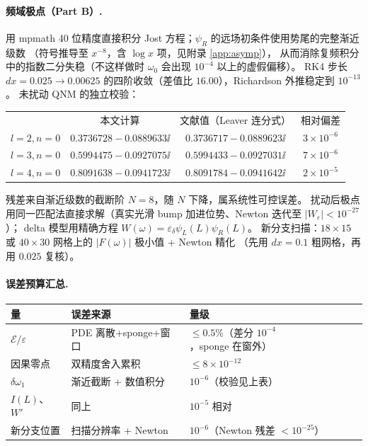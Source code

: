 \paragraph{频域极点（Part B）.}
用 mpmath 40 位精度直接积分 Jost 方程；$\psi_R$ 的远场初条件使用势尾的完整渐近级数
（符号推导至 $x^{-8}$，含 $\log x$ 项，见附录 \ref{app:asymp}），
从而消除复频积分中的指数二分失稳（不这样做时 $\omega_0$ 会出现 $10^{-4}$ 以上的虚假偏移）。
RK4 步长 $dx=0.025\to0.00625$ 的四阶收敛（差值比 $16.00$），Richardson 外推稳定到 $10^{-13}$。
未扰动 QNM 的独立校验：
\begin{center}\small
\begin{tabular}{lccc}
\toprule
 & {本文计算}& {文献值（Leaver 连分式）\cite{Leaver1985,Berti2009}}& {相对偏差}\\
$l=2,n=0$ & $0.3736728-0.0889633\ii$ & $0.3736717-0.0889623\ii$ & $3\times10^{-6}$\\
$l=3,n=0$ & $0.5994475-0.0927075\ii$ & $0.5994433-0.0927031\ii$ & $7\times10^{-6}$\\
$l=4,n=0$ & $0.8091638-0.0941723\ii$ & $0.8091784-0.0941642\ii$ & $2\times10^{-5}$\\
\bottomrule
\end{tabular}
\end{center}
残差来自渐近级数的截断阶 $N=8$，随 $N$ 下降，属系统性可控误差。
扰动后极点用同一匹配法直接求解（真实光滑 bump 加进位势、Newton 迭代至 $|W_\varepsilon|<10^{-27}$）；
delta 模型用精确方程 $W(\omega)=\varepsilon_\delta\psi_L(L)\psi_R(L)$。
新分支扫描：$18\times15$ 或 $40\times30$ 网格上的 $|F(\omega)|$ 极小值 + Newton 精化
（先用 $dx=0.1$ 粗网格，再用 $0.025$ 复核）。

\paragraph{误差预算汇总.}
\begin{center}\small
\begin{tabular}{lll}
\toprule
{量}& {误差来源}& {量级}\\
\midrule
$\mathcal E/\varepsilon$ & {PDE 离散+sponge+窗口}& {$\le0.5\%$（差分 $10^{-4}$，sponge 在窗外）}\\
{因果零点}& {双精度舍入累积}& $\le8\times10^{-12}$\\
$\delta\omega_1$ & {渐近截断 + 数值积分}& {$10^{-6}$（校验见上表）}\\
{$I(L)$、$W'$}& {同上}& {$10^{-5}$ 相对}\\
{新分支位置}& {扫描分辨率 + Newton}& {$10^{-6}$（Newton 残差 $<10^{-25}$）}\\
\bottomrule
\end{tabular}
\end{center}


